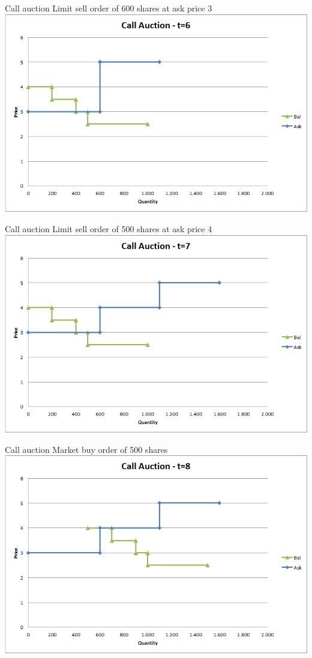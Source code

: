 \documentclass[english,10pt
,aspectratio=169
]{beamer}
\begin{document}
\begin{frame}{Call auction}
	Limit sell order of 600 shares at ask price 3
	\quad
	\center
	\includegraphics[width=.75\linewidth]{pics/Call_t6}
\end{frame}


\begin{frame}{Call auction}
	Limit sell order of 500 shares at ask price 4
	\quad
	\center
	\includegraphics[width=.75\linewidth]{pics/Call_t7}
\end{frame}


\begin{frame}{Call auction}
	Market buy order of 500 shares
	\quad
	\center
	\includegraphics[width=.75\linewidth]{pics/Call_t8}
\end{frame}
\end{document}
